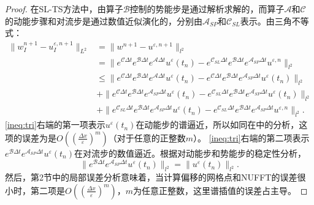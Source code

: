 \begin{proof}
在SL-TS方法中，由算子$\mathcal{B}$控制的势能步是通过解析求解的，而算子$\mathcal{A}$和$\mathcal{C}$的动能步骤和对流步是通过数值近似演化的，分别由$\mathcal{A}_{SP}$和$\mathcal{C}_{SL}$表示。由三角不等式：
	\begin{align}\label{ineq:tri}
	\|w^{n+1}_I-u^{\varepsilon,n+1}_I\|_{L^2}&=\|w^{n+1}-u^{\varepsilon,n+1}\|_{l^2} \nonumber\\
	&=\|e^{\mathcal{C}\Delta t}e^{\mathcal{B}\Delta t}e^{\mathcal{A}\Delta t}u^\varepsilon(t_n)-e^{\mathcal{C}_{SL}\Delta t}e^{\mathcal{B}\Delta t}e^{\mathcal{A}_{SP}\Delta t}u^{\varepsilon,n}\|_{l^2} \nonumber\\
	&\leq \|e^{\mathcal{C}\Delta t}e^{\mathcal{B}\Delta t}e^{\mathcal{A}\Delta t}u^\varepsilon(t_n)-e^{\mathcal{C}\Delta t}e^{\mathcal{B}\Delta t}e^{\mathcal{A}_{SP}\Delta t}u^\varepsilon(t_n)\|_{l^2} \nonumber\\
	&+\|e^{\mathcal{C}\Delta t}e^{\mathcal{B}\Delta t}e^{\mathcal{A}_{SP}\Delta t}u^\varepsilon(t_n)-e^{\mathcal{C}_{SL}\Delta t}e^{\mathcal{B}\Delta t}e^{\mathcal{A}_{SP}\Delta t}u^\varepsilon(t_n)\|_{l^2} \nonumber\\
	&+\|e^{\mathcal{C}_{SL}\Delta t}e^{\mathcal{B}\Delta t}e^{\mathcal{A}_{SP}\Delta t}u^\varepsilon(t_n)-e^{\mathcal{C}_{SL}\Delta t}e^{\mathcal{B}\Delta t}e^{\mathcal{A}_{SP}\Delta t}u^{\varepsilon,n}\|_{l^2}.
	\end{align}
	\eqref{ineq:tri}右端的第一项表示$u^\varepsilon(t_n)$在动能步的谱逼近，所以如同在中的分析，这项的误差为是$O((\frac{\Delta x}{\varepsilon})^m)$（对于任意的正整数$m$）。
	\eqref{ineq:tri}右端的第二项表示$e^{\mathcal{B}\Delta t}e^{\mathcal{A}_{SP}\Delta t}u^\varepsilon(t_n)$在对流步的数值逼近。根据对动能步和势能步的稳定性分析，
	$$
	\| e^{\mathcal{B}\Delta t}e^{\mathcal{A}_{SP}\Delta t}u^\varepsilon(t_n) \|_{l^2}=\| u^\varepsilon(t_n) \|_{l^2}.
	$$   
	然后，第2节中的局部误差分析意味着，当计算偏移的网格点和NUFFT的误差很小时，第二项是$O((\frac{\Delta x}{\varepsilon})^m)$，$m$为任意正整数，这里谱插值的误差占主导。
	

\end{proof}
